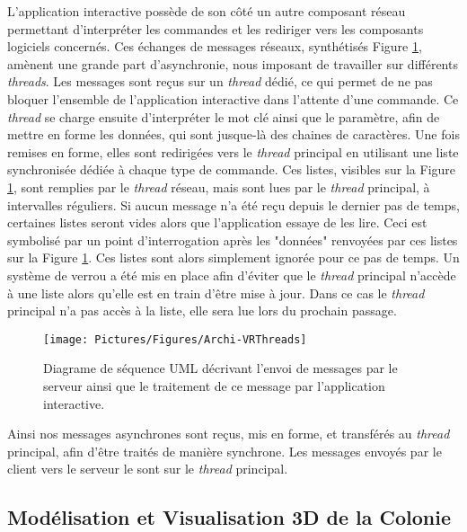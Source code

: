 	L'application interactive possède de son côté un autre composant réseau permettant d'interpréter les commandes et les rediriger vers les composants logiciels concernés. Ces échanges de messages réseaux, synthétisés Figure \ref{VRThreads}, amènent une grande part d'asynchronie, nous imposant de travailler sur différents \textit{threads}. Les messages sont reçus sur un \textit{thread} dédié, ce qui permet de ne pas bloquer l'ensemble de l'application interactive dans l'attente d'une commande. Ce \textit{thread} se charge ensuite d'interpréter le mot clé ainsi que le paramètre, afin de mettre en forme les données, qui sont jusque-là des chaines de caractères. Une fois remises en forme, elles sont redirigées vers le \textit{thread} principal en utilisant une liste synchronisée dédiée à chaque type de commande. Ces listes, visibles sur la Figure \ref{VRThreads}, sont remplies par le \textit{thread} réseau, mais sont lues par le \textit{thread} principal, à intervalles réguliers. 
	Si aucun message n'a été reçu depuis le dernier pas de temps, certaines listes seront vides alors que l'application essaye de les lire. Ceci est symbolisé par un point d'interrogation après les "données" renvoyées par ces listes sur la Figure \ref{VRThreads}. Ces listes sont alors simplement ignorée pour ce pas de temps. 
	Un système de verrou a été mis en place afin d'éviter que le \textit{thread} principal n'accède à une liste alors qu'elle est en train d'être mise à jour. Dans ce cas le \textit{thread} principal n'a pas accès à la liste, elle sera lue lors du prochain passage.
	
	\begin{figure}
		\texttt{[image: Pictures/Figures/Archi-VRThreads]}
		\caption{Diagrame de séquence UML décrivant l'envoi de messages par le serveur ainsi que le traitement de ce message par l'application interactive.}
		\label{VRThreads}
	\end{figure}
	
	Ainsi nos messages asynchrones sont reçus, mis en forme, et transférés au \textit{thread} principal, afin d'être traités de manière synchrone. Les messages envoyés par le client vers le serveur le sont sur le \textit{thread} principal.
	
	\subsection{Modélisation et Visualisation 3D de la Colonie}		
	
